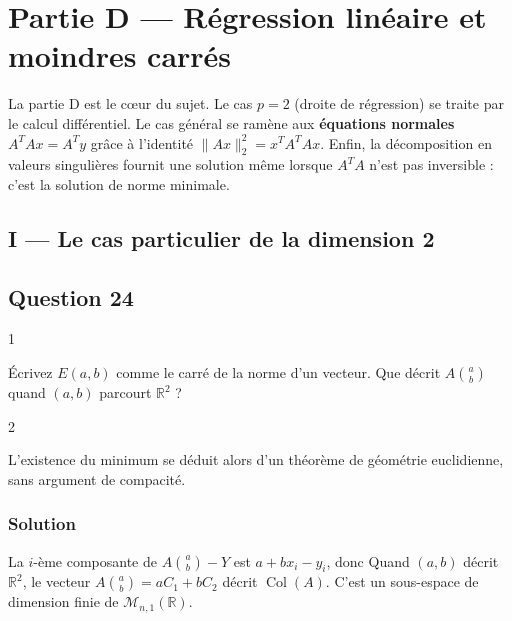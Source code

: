 \documentclass[11pt,a4paper]{article}
\newcommand{\equationajustee}[1]{%
  \sbox{\boiteequation}{$\displaystyle #1$}%
  \ifdim\wd\boiteequation>\linewidth
    \[\resizebox{\linewidth}{!}{\usebox{\boiteequation}}\]%
  \else
    \[#1\]%
  \fi}
\begin{document}
\hypertarget{partie-d-ruxe9gression-linuxe9aire-et-moindres-carruxe9s}{%
\section{Partie D --- Régression linéaire et moindres carrés}\label{partie-d-ruxe9gression-linuxe9aire-et-moindres-carruxe9s}}

La partie D est le cœur du sujet. Le cas \(p=2\) (droite de régression) se traite par le calcul différentiel. Le cas général se ramène aux \textbf{équations normales} \(A^TAx=A^Ty\) grâce à l'identité \(\|Ax\|_2^2=x^TA^TAx\). Enfin, la décomposition en valeurs singulières fournit une solution même lorsque \(A^TA\) n'est pas inversible : c'est la solution de norme minimale.

\hypertarget{i-le-cas-particulier-de-la-dimension-2}{%
\subsection{I --- Le cas particulier de la dimension 2}\label{i-le-cas-particulier-de-la-dimension-2}}

\hypertarget{question-24}{%
\subsection{Question 24}\label{question-24}}

\begin{indication}{1}

Écrivez \(E(a,b)\) comme le carré de la norme d'un vecteur. Que décrit \(A\binom ab\) quand \((a,b)\) parcourt \(\mathbb R^2\) ?

\end{indication}

\begin{indication}{2}

L'existence du minimum se déduit alors d'un théorème de géométrie euclidienne, sans argument de compacité.

\end{indication}

\hypertarget{solution-23}{%
\subsubsection{Solution}\label{solution-23}}

La \(i\)-ème composante de \(A\binom ab-Y\) est \(a+bx_i-y_i\), donc
\equationajustee{E(a,b)=\left\|A\binom ab-Y\right\|_2^2.}
Quand \((a,b)\) décrit \(\mathbb R^2\), le vecteur \(A\binom ab=aC_1+bC_2\) décrit \(\operatorname{Col}(A)\). C'est un sous-espace de dimension finie de \(\mathcal M_{n,1}(\mathbb R)\).
\end{document}

